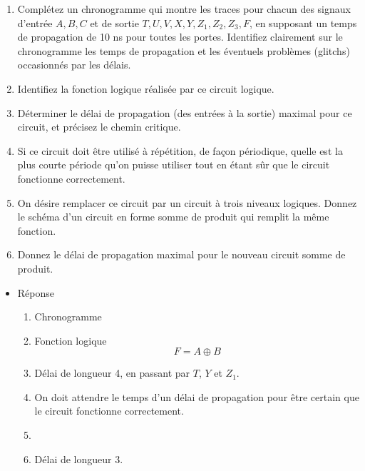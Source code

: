 \documentclass[letter, oneside]{book}
\begin{document}
\begin{itemize}
\begin{enumerate}
\item Complétez un chronogramme qui montre les traces pour chacun des
signaux d'entrée \(A, B, C\) et de sortie \(T, U, V, X, Y, Z_1,
   Z_2, Z_3, F\), en supposant un temps de propagation de 10 ns
pour toutes les portes. Identifiez clairement sur le
chronogramme les temps de propagation et les éventuels problèmes
(glitchs) occasionnés par les délais.

\item Identifiez la fonction logique réalisée par ce circuit logique.

\item Déterminer le délai de propagation (des entrées à la sortie)
maximal pour ce circuit, et précisez le chemin critique.

\item Si ce circuit doit être utilisé à répétition, de façon périodique,
quelle est la plus courte période qu'on puisse utiliser tout en
étant sûr que le circuit fonctionne correctement.

\item On désire remplacer ce circuit par un circuit à trois niveaux
logiques. Donnez le schéma d'un circuit en forme somme de produit
qui remplit la même fonction.

\item Donnez le délai de propagation maximal pour le nouveau circuit
somme de produit.
\end{enumerate}

\begin{itemize}
\item Réponse
\label{sec:orgf0b2c22}
\begin{enumerate}
\item Chronogramme

\begin{center}

\end{center}

\item Fonction logique
$$
     F = A \oplus B
   $$

\item Délai de longueur 4, en passant par \(T\), \(Y\) et \(Z_1\).

\item On doit attendre le temps d'un délai de propagation pour être
certain que le circuit fonctionne correctement.

\item 

\item Délai de longueur 3.
\end{enumerate}
\end{itemize}
\end{itemize}
\end{document}

